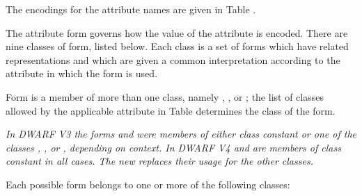 The encodings for the attribute names are given in 
Table .

The attribute form governs how the value of the attribute is
encoded. There are nine classes of form, listed below. Each
class is a set of forms which have related representations
and which are given a common interpretation according to the
attribute in which the form is used.

Form  
is a member of more 
than 
one 
class,
namely , 
, 
 or 
; the list
of classes allowed by the applicable attribute in 
Table 
determines the class of the form.

\textit{In DWARF V3 the forms  and 
 were
members 
of 
either 
class constant 
or one of the classes 
,
, 
 or 
, depending on context. In
DWARF V4 
 and 
 are members of class
constant in all cases. 
The new 
 replaces
their usage for the other classes.}

Each possible form belongs to one or more of the following classes:

